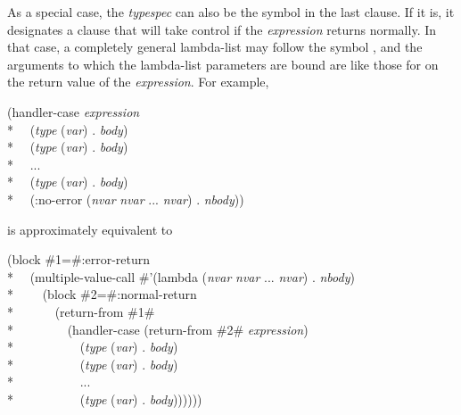 \begin{defmac}
As a special case, the \emph{typespec} can also be the symbol  in
the last clause.  If it is, it designates a clause that will take control if the
\emph{expression} returns normally. In that case, a completely general
lambda-list may follow the symbol , and the arguments to which the
lambda-list parameters are bound are like those for  on
the return value of the \emph{expression}.  For example,
\begin{lisp}
(handler-case \emph{expression} \\*
~~(\emph{type} (\emph{var}) . \emph{body}) \\*
~~(\emph{type} (\emph{var}) . \emph{body}) \\*
~~... \\*
~~(\emph{type} (\emph{var}) . \emph{body}) \\*
~~(:no-error (\emph{nvar} \emph{nvar} ... \emph{nvar}) . \emph{nbody}))
\end{lisp}
is approximately equivalent to
\begin{lisp}
(block \#1=\#:error-return \\*
~~(multiple-value-call \#'(lambda (\emph{nvar} \emph{nvar} ... \emph{nvar}) . \emph{nbody}) \\*
~~~~(block \#2=\#:normal-return \\*
~~~~~~(return-from \#1\# \\*
~~~~~~~~(handler-case (return-from \#2\# \emph{expression}) \\*
~~~~~~~~~~(\emph{type} (\emph{var}) . \emph{body}) \\*
~~~~~~~~~~(\emph{type} (\emph{var}) . \emph{body}) \\*
~~~~~~~~~~... \\*
~~~~~~~~~~(\emph{type} (\emph{var}) . \emph{body}))))))
\end{lisp}


\end{defmac}
